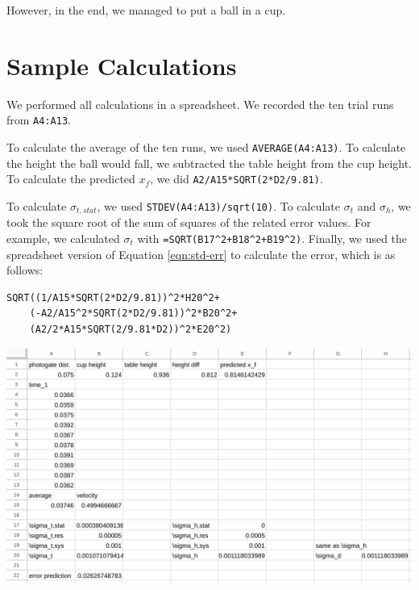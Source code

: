 \documentclass[12pt]{article}
\begin{document}
However, in the end, we managed to put a ball in a cup.
\section{Sample Calculations}
\label{sec:orgd4621e5}

We performed all calculations in a spreadsheet. We recorded the ten trial runs from \texttt{A4:A13}.

To calculate the average of the ten runs, we used \texttt{AVERAGE(A4:A13)}. To calculate the height the ball would fall, we subtracted the table height from the cup height. To calculate the predicted \(x_f\), we did \texttt{A2/A15*SQRT(2*D2/9.81)}.

To calculate \(\sigma_{t,stat}\), we used \texttt{STDEV(A4:A13)/sqrt(10)}. To calculate \(\sigma_t\) and \(\sigma_h\), we took the square root of the sum of squares of the related error values. For example, we calculated \(\sigma_t\) with \texttt{=SQRT(B17\textasciicircum{}2+B18\textasciicircum{}2+B19\textasciicircum{}2)}. Finally, we used the spreadsheet version of Equation \ref{eqn:std-err} to calculate the error, which is as follows:
\begin{verbatim}
SQRT((1/A15*SQRT(2*D2/9.81))^2*H20^2+
    (-A2/A15^2*SQRT(2*D2/9.81))^2*B20^2+
    (A2/2*A15*SQRT(2/9.81*D2))^2*E20^2)
\end{verbatim}

\begin{center}
\includegraphics[width=6.5in]{./spreadsheet.png}
\end{center}
\end{document}
